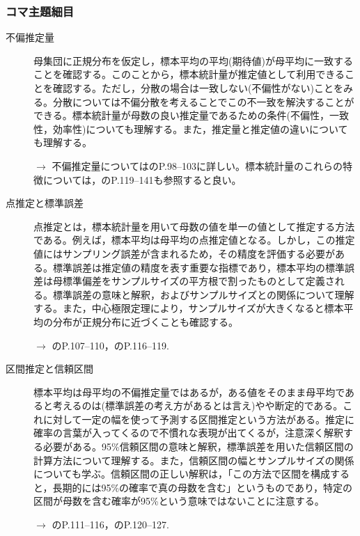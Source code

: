 \subsubsection{コマ主題細目}
\begin{description}
	\item[不偏推定量] 母集団に正規分布を仮定し，標本平均の平均(期待値)が母平均に一致することを確認する。このことから，標本統計量が推定値として利用できることを確認する。ただし，分散の場合は一致しない(不偏性がない)ことをみる。分散については不偏分散を考えることでこの不一致を解決することができる。標本統計量が母数の良い推定量であるための条件(不偏性，一致性，効率性)についても理解する。また，推定量と推定値の違いについても理解する。
	      \begin{flushright}
		      $\to$ 不偏推定量については\textcite{Yamada2004}のP.98--103に詳しい。標本統計量のこれらの特徴については，\textcite{kosugi2023}のP.119--141も参照すると良い。
	      \end{flushright}

	\item[点推定と標準誤差] 点推定とは，標本統計量を用いて母数の値を単一の値として推定する方法である。例えば，標本平均は母平均の点推定値となる。しかし，この推定値にはサンプリング誤差が含まれるため，その精度を評価する必要がある。標準誤差は推定値の精度を表す重要な指標であり，標本平均の標準誤差は母標準偏差をサンプルサイズの平方根で割ったものとして定義される。標準誤差の意味と解釈，およびサンプルサイズとの関係について理解する。また，中心極限定理により，サンプルサイズが大きくなると標本平均の分布が正規分布に近づくことも確認する。
	      \begin{flushright}
		      $\to$ \textcite{Kawabata201408}のP.107--110，\textcite{Yamada2004}のP.116--119.
	      \end{flushright}

	\item[区間推定と信頼区間] 標本平均は母平均の不偏推定量ではあるが，ある値をそのまま母平均であると考えるのは(標準誤差の考え方があるとは言え)やや断定的である。これに対して一定の幅を使って予測する区間推定という方法がある。推定に確率の言葉が入ってくるので不慣れな表現が出てくるが，注意深く解釈する必要がある。95\%信頼区間の意味と解釈，標準誤差を用いた信頼区間の計算方法について理解する。また，信頼区間の幅とサンプルサイズの関係についても学ぶ。信頼区間の正しい解釈は，「この方法で区間を構成すると，長期的には95\%の確率で真の母数を含む」というものであり，特定の区間が母数を含む確率が95\%という意味ではないことに注意する。
	      \begin{flushright}
		      $\to$ \textcite{Kawabata201408}のP.111--116，\textcite{Yamada2004}のP.120--127.
	      \end{flushright}



\end{description}
